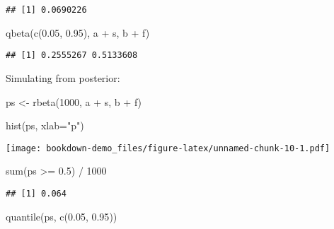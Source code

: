 \documentclass[
]{book}
\newenvironment{Shaded}{\begin{snugshade}}{\end{snugshade}}
\newcommand{\AttributeTok}[1]{\textcolor[rgb]{0.77,0.63,0.00}{#1}}
\newcommand{\DecValTok}[1]{\textcolor[rgb]{0.00,0.00,0.81}{#1}}
\newcommand{\FloatTok}[1]{\textcolor[rgb]{0.00,0.00,0.81}{#1}}
\newcommand{\FunctionTok}[1]{\textcolor[rgb]{0.00,0.00,0.00}{#1}}
\newcommand{\NormalTok}[1]{#1}
\newcommand{\OtherTok}[1]{\textcolor[rgb]{0.56,0.35,0.01}{#1}}
\newcommand{\SpecialCharTok}[1]{\textcolor[rgb]{0.00,0.00,0.00}{#1}}
\newcommand{\StringTok}[1]{\textcolor[rgb]{0.31,0.60,0.02}{#1}}
\begin{document}
\begin{verbatim}
## [1] 0.0690226
\end{verbatim}

\begin{Shaded}
\begin{Highlighting}[]
\FunctionTok{qbeta}\NormalTok{(}\FunctionTok{c}\NormalTok{(}\FloatTok{0.05}\NormalTok{, }\FloatTok{0.95}\NormalTok{), a }\SpecialCharTok{+}\NormalTok{ s, b }\SpecialCharTok{+}\NormalTok{ f)}
\end{Highlighting}
\end{Shaded}

\begin{verbatim}
## [1] 0.2555267 0.5133608
\end{verbatim}

Simulating from posterior:

\begin{Shaded}
\begin{Highlighting}[]
\NormalTok{ps }\OtherTok{\textless{}{-}} \FunctionTok{rbeta}\NormalTok{(}\DecValTok{1000}\NormalTok{, a }\SpecialCharTok{+}\NormalTok{ s, b }\SpecialCharTok{+}\NormalTok{ f)}
\end{Highlighting}
\end{Shaded}

\begin{Shaded}
\begin{Highlighting}[]
\FunctionTok{hist}\NormalTok{(ps, }\AttributeTok{xlab=}\StringTok{"p"}\NormalTok{)}
\end{Highlighting}
\end{Shaded}

\texttt{[image: bookdown-demo\_files/figure-latex/unnamed-chunk-10-1.pdf]}

\begin{Shaded}
\begin{Highlighting}[]
\FunctionTok{sum}\NormalTok{(ps }\SpecialCharTok{\textgreater{}=} \FloatTok{0.5}\NormalTok{) }\SpecialCharTok{/} \DecValTok{1000}
\end{Highlighting}
\end{Shaded}

\begin{verbatim}
## [1] 0.064
\end{verbatim}

\begin{Shaded}
\begin{Highlighting}[]
\FunctionTok{quantile}\NormalTok{(ps, }\FunctionTok{c}\NormalTok{(}\FloatTok{0.05}\NormalTok{, }\FloatTok{0.95}\NormalTok{))}
\end{Highlighting}
\end{Shaded}
\end{document}
